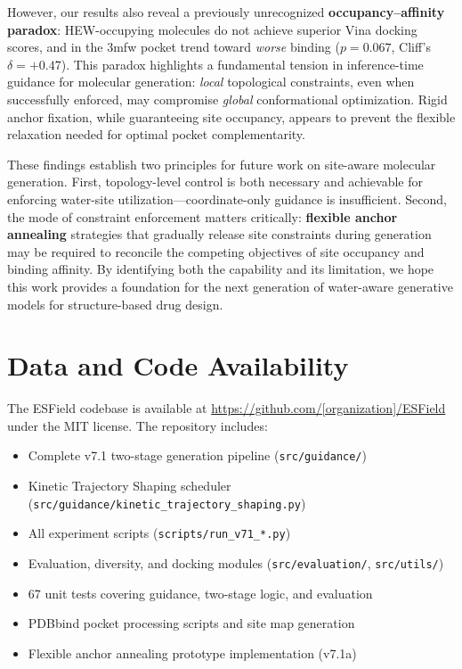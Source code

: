 \documentclass[11pt,letterpaper]{article}
\begin{document}
However, our results also reveal a previously unrecognized
\textbf{occupancy--affinity paradox}: HEW-occupying molecules do not achieve
superior Vina docking scores, and in the 3mfw pocket trend toward
\emph{worse} binding ($p = 0.067$, Cliff's $\delta = +0.47$).  This paradox
highlights a fundamental tension in inference-time guidance for molecular
generation: \emph{local} topological constraints, even when successfully
enforced, may compromise \emph{global} conformational optimization.  Rigid
anchor fixation, while guaranteeing site occupancy, appears to prevent the
flexible relaxation needed for optimal pocket complementarity.

These findings establish two principles for future work on site-aware molecular
generation.  First, topology-level control is both necessary and achievable for
enforcing water-site utilization---coordinate-only guidance is insufficient.
Second, the mode of constraint enforcement matters critically: \textbf{flexible
anchor annealing} strategies that gradually release site constraints during
generation may be required to reconcile the competing objectives of site
occupancy and binding affinity.  By identifying both the capability and its
limitation, we hope this work provides a foundation for the next generation of
water-aware generative models for structure-based drug design.

\section{Data and Code Availability}

The ESField codebase is available at
\url{https://github.com/[organization]/ESField} under the MIT license.
The repository includes:

\begin{itemize}
  \item Complete v7.1 two-stage generation pipeline (\texttt{src/guidance/})
  \item Kinetic Trajectory Shaping scheduler (\texttt{src/guidance/kinetic\_trajectory\_shaping.py})
  \item All experiment scripts (\texttt{scripts/run\_v71\_*.py})
  \item Evaluation, diversity, and docking modules (\texttt{src/evaluation/},
    \texttt{src/utils/})
  \item 67 unit tests covering guidance, two-stage logic, and evaluation
  \item PDBbind pocket processing scripts and site map generation
  \item Flexible anchor annealing prototype implementation (v7.1a)
\end{itemize}
\end{document}
